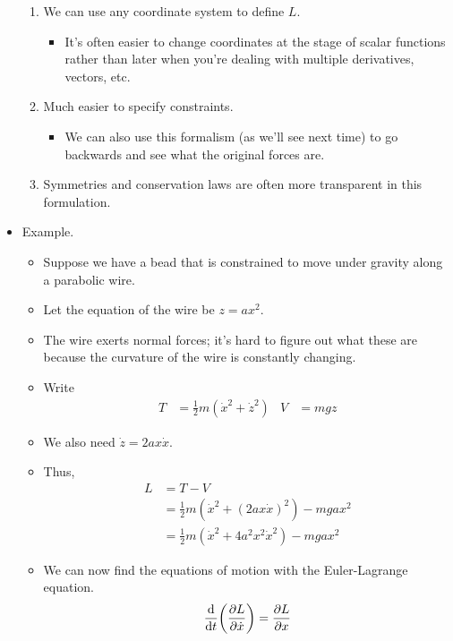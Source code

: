 \documentclass[../notes.tex]{subfiles}
\begin{document}
\begin{itemize}
\begin{enumerate}
        \item We can use any coordinate system to define $L$.
        \begin{itemize}
            \item It's often easier to change coordinates at the stage of scalar functions rather than later when you're dealing with multiple derivatives, vectors, etc.
        \end{itemize}
        \item Much easier to specify constraints.
        \begin{itemize}
            \item We can also use this formalism (as we'll see next time) to go backwards and see what the original forces are.
        \end{itemize}
        \item Symmetries and conservation laws are often more transparent in this formulation.
    \end{enumerate}
    \item Example.
    \begin{itemize}
        \item Suppose we have a bead that is constrained to move under gravity along a parabolic wire.
        \item Let the equation of the wire be $z=ax^2$.
        \item The wire exerts normal forces; it's hard to figure out what these are because the curvature of the wire is constantly changing.
        \item Write
        \begin{align*}
            T &= \frac{1}{2}m(\dot{x}^2+\dot{z}^2)&
            V &= mgz
        \end{align*}
        \item We also need $\dot{z}=2ax\dot{x}$.
        \item Thus,
        \begin{align*}
            L &= T-V\\
            &= \frac{1}{2}m(\dot{x}^2+(2ax\dot{x})^2)-mgax^2\\
            &= \frac{1}{2}m(\dot{x}^2+4a^2x^2\dot{x}^2)-mgax^2
        \end{align*}
        \item We can now find the equations of motion with the Euler-Lagrange equation.
        \begin{align*}
            \dv{t}(\pdv{L}{\dot{x}}) &= \pdv{L}{x}\\

\end{align*}
\end{itemize}
\end{itemize}
\end{document}
